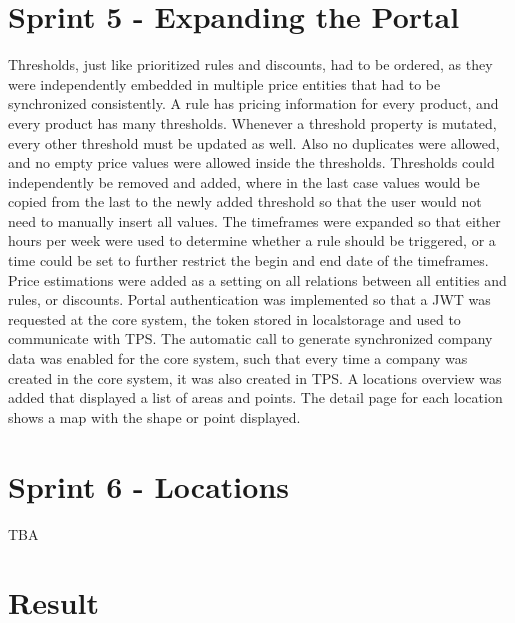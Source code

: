 \section{Sprint 5 - Expanding the Portal}
Thresholds, just like prioritized rules and discounts, had to be ordered, as they were independently embedded in multiple price entities that had to be synchronized consistently. A rule has pricing information for every product, and every product has many thresholds. Whenever a threshold property is mutated, every other threshold must be updated as well. Also no duplicates were allowed, and no empty price values were allowed inside the thresholds. Thresholds could independently be removed and added, where in the last case values would be copied from the last to the newly added threshold so that the user would not need to manually insert all values. The timeframes were expanded so that either hours per week were used to determine whether a rule should be triggered, or a time could be set to further restrict the begin and end date of the timeframes. Price estimations were added as a setting on all relations between all entities and rules, or discounts. Portal authentication was implemented so that a JWT was requested at the core system, the token stored in localstorage and used to communicate with TPS. The automatic call to generate synchronized company data was enabled for the core system, such that every time a company was created in the core system, it was also created in TPS. A locations overview was added that displayed a list of areas and points. The detail page for each location shows a map with the shape or point displayed.

%
\section{Sprint 6 - Locations}
TBA

%
\section{Result}